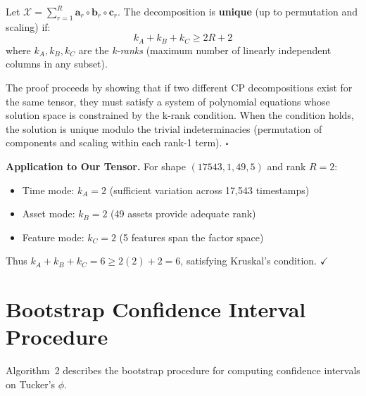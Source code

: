 \documentclass[11pt,twocolumn]{article}
\begin{document}
\begin{tcolorbox}[colback=gray!5,colframe=farzullaburgundy,title={\textbf{Theorem 3} (Kruskal, 1977)}]
Let $\mathcal{X} = \sum_{r=1}^R \mathbf{a}_r \circ \mathbf{b}_r \circ \mathbf{c}_r$. The decomposition is \textbf{unique} (up to permutation and scaling) if:
\begin{equation}
k_A + k_B + k_C \geq 2R + 2
\end{equation}
where $k_A, k_B, k_C$ are the \textit{k-ranks} (maximum number of linearly independent columns in any subset).
\end{tcolorbox}

\begin{tcolorbox}[colback=white,colframe=gray!50,title={\textit{Proof Sketch}}]
The proof proceeds by showing that if two different CP decompositions exist for the same tensor, they must satisfy a system of polynomial equations whose solution space is constrained by the k-rank condition. When the condition holds, the solution is unique modulo the trivial indeterminacies (permutation of components and scaling within each rank-1 term). \hfill $\square$
\end{tcolorbox}

\vspace{0.5em}
\noindent\textbf{Application to Our Tensor.} For shape $(17543, 1, 49, 5)$ and rank $R=2$:
\begin{itemize}
    \item Time mode: $k_A = 2$ (sufficient variation across 17,543 timestamps)
    \item Asset mode: $k_B = 2$ (49 assets provide adequate rank)
    \item Feature mode: $k_C = 2$ (5 features span the factor space)
\end{itemize}

Thus $k_A + k_B + k_C = 6 \geq 2(2) + 2 = 6$, satisfying Kruskal's condition. $\checkmark$

\section{Bootstrap Confidence Interval Procedure}
\label{app:bootstrap}

Algorithm~2 describes the bootstrap procedure for computing confidence intervals on Tucker's $\phi$.
\end{document}
